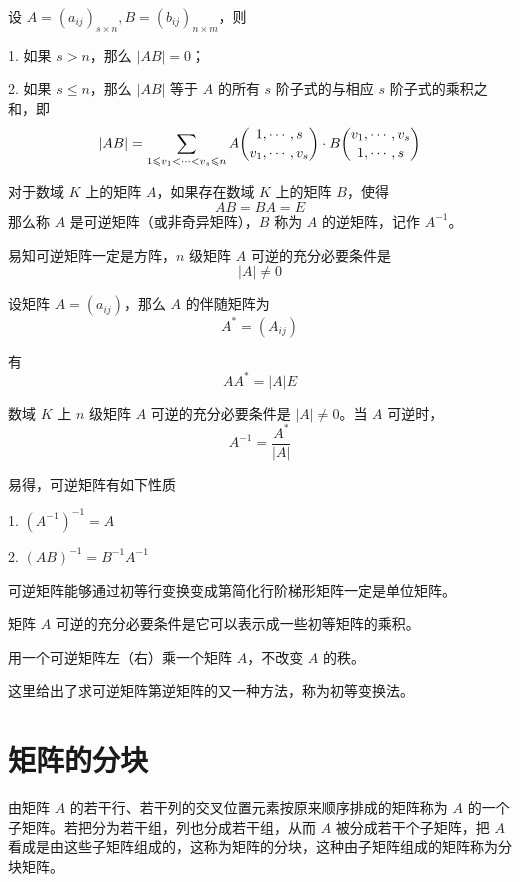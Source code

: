 \begin{theorem}
    设 $A = (a_{ij})_{s\times n},B = (b_{ij})_{n\times m}$，则

    1. 如果 $s>n$，那么 $|AB| = 0$；

    2. 如果 $s\leqslant n$，那么  $|AB|$ 等于 $A$ 的所有 $s$ 阶子式的与相应 $s$ 阶子式的乘积之和，即
    $$|AB|=\sum_{1\leqslant v_1<\cdots< v_s\leqslant n}A \dbinom{1,\cdots,s}{v_1,\cdots,v_s} \cdot B \dbinom{v_1,\cdots,v_s}{1,\cdots,s}$$
\end{theorem}

\begin{definition}
    对于数域 $K$ 上的矩阵 $A$，如果存在数域 $K$ 上的矩阵 $B$，使得
    $$AB = BA = E$$
    那么称 $A$ 是可逆矩阵（或非奇异矩阵），$B$ 称为 $A$ 的逆矩阵，记作 $A^{-1}$。
\end{definition}

易知可逆矩阵一定是方阵，$n$ 级矩阵 $A$ 可逆的充分必要条件是
$$|A| \ne 0$$

\begin{definition}
    设矩阵 $A = (a_{ij})$，那么 $A$ 的伴随矩阵为
    $$A^*=(A_{ij})$$
\end{definition}

有
$$AA^* = |A|E$$

\begin{theorem}
    数域 $K$ 上 $n$ 级矩阵 $A$ 可逆的充分必要条件是 $|A| \ne 0$。当 $A$ 可逆时，
    $$A^{-1} = \frac{A^*}{|A|}$$
\end{theorem}

易得，可逆矩阵有如下性质

1. $(A^{-1})^{-1} = A$

2. $(AB)^{-1} = B^{-1}A^{-1}$

可逆矩阵能够通过初等行变换变成第简化行阶梯形矩阵一定是单位矩阵。

\begin{theorem}
    矩阵 $A$ 可逆的充分必要条件是它可以表示成一些初等矩阵的乘积。
\end{theorem}

用一个可逆矩阵左（右）乘一个矩阵 $A$，不改变 $A$ 的秩。

这里给出了求可逆矩阵第逆矩阵的又一种方法，称为初等变换法。

\section{矩阵的分块}

由矩阵 $A$ 的若干行、若干列的交叉位置元素按原来顺序排成的矩阵称为 $A$ 的一个子矩阵。若把分为若干组，列也分成若干组，从而 $A$ 被分成若干个子矩阵，把 $A$ 看成是由这些子矩阵组成的，这称为矩阵的分块，这种由子矩阵组成的矩阵称为分块矩阵。

